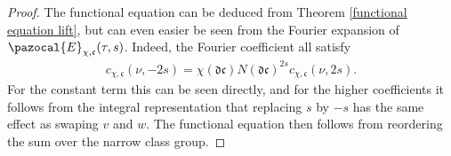 \documentclass[twoside,a4paper,10pt]{article} %
\newcommand{\8}{\infty}
\newcommand{\dfrak}{\mathfrak{d}}
\newcommand{\cfrak}{\mathfrak{c}}
\newcommand{\Ecal}{\pazocal{E}}
\theoremstyle{mytheoremstyle}
\theoremstyle{remark}
\numberwithin{equation}{section}
\begin{document}
\begin{proof} The functional equation can be deduced from Theorem \ref{functional equation lift}, but can even easier be seen from the Fourier expansion of $\Ecal_{\chi,\cfrak}(\tau,s)$. Indeed, the Fourier coefficient all satisfy 
\begin{align} \label{funceqdivisor}
c_{\chi,\cfrak}(\nu,-2s)=\chi(\dfrak\cfrak)N(\dfrak\cfrak)^{2s}c_{\chi,\cfrak}(\nu,2s).
\end{align}
For the constant term this can be seen directly, and for the higher coefficients it follows from the integral representation that replacing $s$ by $-s$ has the same effect as swaping $v$ and $w$. The functional equation then follows from reordering the sum over the narrow class group.
\end{proof}
\end{document}
